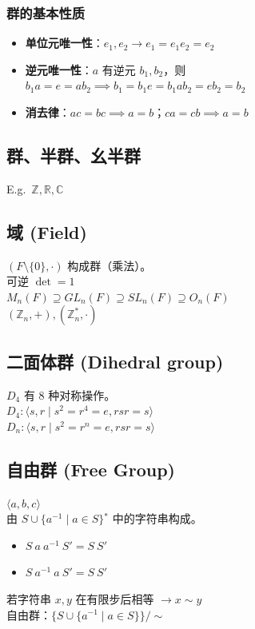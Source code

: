 \documentclass[12pt, a4paper]{article}
\begin{document}
\subsubsection*{群的基本性质}
\begin{itemize}
    \item \textbf{单位元唯一性}：$e_1, e_2 \to e_1 = e_1 e_2 = e_2$
    \item \textbf{逆元唯一性}：$a$ 有逆元 $b_1, b_2$，则 $b_1 a = e = a b_2 \implies b_1 = b_1 e = b_1 a b_2 = e b_2 = b_2$
    \item \textbf{消去律}：$ac = bc \implies a=b$；$ca = cb \implies a=b$
\end{itemize}

\subsection*{群、半群、幺半群}
E.g.\  \(\mathbb{Z}, \mathbb{R}, \mathbb{C}\)

\subsection*{域 (Field)}
\((F \setminus \{0\}, \cdot)\) 构成群（乘法）。\\
可逆 $\det = 1$ \\
\(M_n(F) \supseteq GL_n(F) \supseteq SL_n(F) \supseteq O_n(F)\) \\
\((\mathbb{Z}_n, +), (\mathbb{Z}_n^*, \cdot)\)

\subsection*{二面体群 (Dihedral group)}
$D_4$ 有 8 种对称操作。\\
$D_4: \langle s, r \mid s^2 = r^4 = e, rsr = s \rangle$ \\
$D_n: \langle s, r \mid s^2 = r^n = e, rsr = s \rangle$

\subsection*{自由群 (Free Group)}
\(\langle a, b, c \rangle\) \\
由 $S \cup \{a^{-1} \mid a \in S\}{}^*$ 中的字符串构成。
\begin{itemize}
    \item $S \ a \ a^{-1} \ S' = S \ S'$
    \item $S \ a^{-1} \ a \ S' = S \ S'$
\end{itemize}
若字符串 $x, y$ 在有限步后相等 $\to x \sim y$ \\
自由群：$\{S \cup \{a^{-1} \mid a \in S\}\} / \sim$
\end{document}
